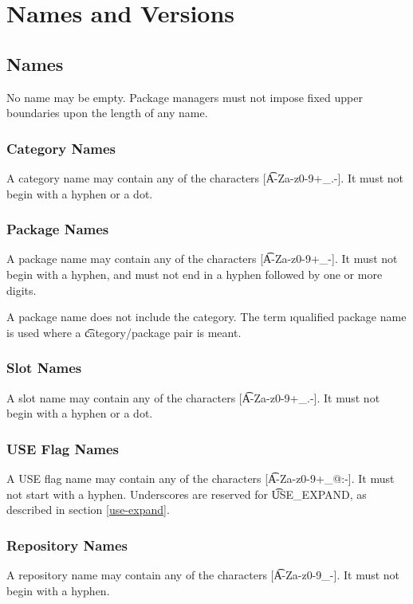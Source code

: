 \chapter{Names and Versions}

\section{Names}

No name may be empty. Package managers must not impose fixed upper boundaries upon the length of any
name.

\subsection{Category Names}
A category name may contain any of the characters [\t{A-Za-z0-9+\_.-}]. It must not begin with
a hyphen or a dot.

\subsection{Package Names}
A package name may contain any of the characters [\t{A-Za-z0-9+\_-}]. It must not begin with a
hyphen, and must not end in a hyphen followed by one or more digits.

\note A package name does not include the category. The term \i{qualified package name} is used
where a \t{category/package} pair is meant.

\subsection{Slot Names}
\label{slot-names}
A slot name may contain any of the characters [\t{A-Za-z0-9+\_.-}]. It must not begin with a
hyphen or a dot.

\subsection{USE Flag Names}
A USE flag name may contain any of the characters [\t{A-Za-z0-9+\_@:-}]. It must not start with
a hyphen. Underscores are reserved for \t{USE\_EXPAND}, as described in section
\ref{use-expand}.

\subsection{Repository Names}
\label{repository-names}
A repository name may contain any of the characters [\t{A-Za-z0-9\_-}]. It must not begin with a
hyphen.

